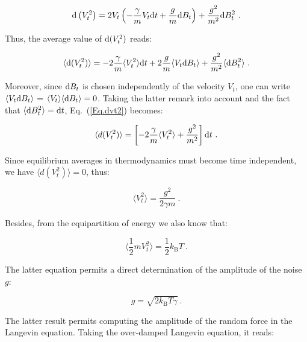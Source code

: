 \begin{equation}
	\textnormal{d}\left(V_t^2\right) = 2V_t\left( -\frac{\gamma}{m}V_t\textnormal{d}t + \frac{g}{m}\textnormal{d}B_t  \right) + \frac{g^2}{m^2}\textnormal{d}B_t ^2 ~. 
\end{equation}

Thus, the average value of $ \textnormal{d}(V_t ^2)$ reads:

\begin{equation}
	\langle \textnormal{d}(V_t ^2)\rangle = -2 \frac{\gamma}{m} \langle V_t ^2 \rangle \textnormal dt + 2 \frac{g}{m} \langle V_t \textnormal{d}B_t \rangle + \frac{g^2}{m^2} \langle \textnormal{d}B_t ^2 \rangle~.
	\label{Eq.dvt2}
\end{equation} 

Moreover, since $\textnormal{d}B_t$ is chosen independently of the velocity $V_t$, one can write $\langle V_t \textnormal{d}B_t \rangle $ = $\langle V_t \rangle \langle \textnormal{d}B_t \rangle  =0 $. Taking the latter remark into account and the fact that $\langle \textnormal{d}B_t ^2\rangle = \textnormal{d}t $, Eq.~(\ref{Eq.dvt2}) becomes:

\begin{equation}
	\langle d(V_t^2) \rangle = \left[-2 \frac{\gamma}{m} \langle V_t ^2 \rangle + \frac{g^2}{m^2}\right]\textnormal{d}t~.
\end{equation}

Since equilibrium averages in thermodynamics must become time independent, we have $\langle d(V_t^2) \rangle = 0$, thus:

\begin{equation}
	\langle V_t ^2\rangle = \frac{g ^2}{2 \gamma m}~. 
\end{equation}

Besides, from the equipartition of energy we also know that:

\begin{equation}
	\langle \frac{1}{2} m V_t ^2 \rangle  = \frac{1}{2} k_\mathrm{B} T~.
\end{equation}

The latter equation permits a direct determination of the amplitude of the noise $g$: 

\begin{equation}
	g = \sqrt{2k_\mathrm{B}T \gamma}~.
\end{equation}

The latter result permits computing the amplitude of the random force in the Langevin equation. Taking the over-damped Langevin equation, it reads:

